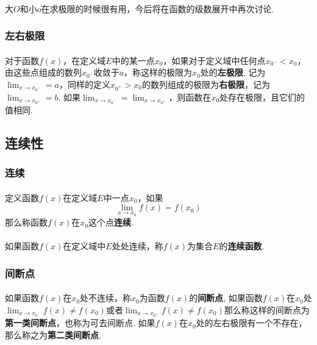 \paragraph{}
大$O$和小$o$在求极限的时候很有用，今后将在函数的级数展开中再次讨论.

\subsubsection{左右极限}
\paragraph{}
对于函数$f(x)$，在定义域$E$中的某一点$x_0$，如果对于定义域中任何点$x_{0^-} < x_0$，由这些点组成的数列${x_{0^-}}$收敛于$a$，称这样的极限为$x_0$处的\textbf{左极限}, 记为$\lim_{x\to x_{0^-}} = a$，同样的定义$x_{0^+} > x_0$的数列组成的极限为\textbf{右极限}，记为$\lim_{x\to x_{0^+}} = b$. 如果$\lim_{x\to x_{0^-}} = \lim_{x\to x_{0^+}}$，则函数在$x_0$处存在极限，且它们的值相同.


\subsection{连续性}

\subsubsection{连续}
\paragraph{}
定义函数$f(x)$在定义域$E$中一点$x_0$，如果
$$
\lim_{x \to x_0} f(x) = f(x_0)
$$
那么称函数$f(x)$在$x_0$这个点\textbf{连续}.

\paragraph{}
如果函数$f(x)$在定义域中$E$处处连续，称$f(x)$为集合$E$的\textbf{连续函数}.

\subsubsection{间断点}
\paragraph{}
如果函数$f(x)$在$x_0$处不连续，称$x_0$为函数$f(x)$的\textbf{间断点},  如果函数$f(x)$在$x_0$处$\lim_{x \to x_{0^-}} f(x) \neq f(x_0)$或者$\lim_{x \to x_{0^+}} f(x) \neq f(x_0)$那么称这样的间断点为\textbf{第一类间断点}，也称为可去间断点.  如果$f(x)$在$x_0$处的左右极限有一个不存在，那么称之为\textbf{第二类间断点}.

